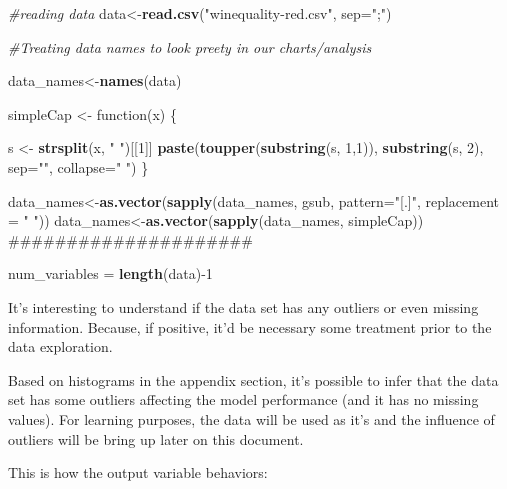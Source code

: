 \documentclass[]{article}
\newenvironment{Shaded}{\begin{snugshade}}{\end{snugshade}}
\newcommand{\KeywordTok}[1]{\textcolor[rgb]{0.13,0.29,0.53}{\textbf{{#1}}}}
\newcommand{\DataTypeTok}[1]{\textcolor[rgb]{0.13,0.29,0.53}{{#1}}}
\newcommand{\DecValTok}[1]{\textcolor[rgb]{0.00,0.00,0.81}{{#1}}}
\newcommand{\StringTok}[1]{\textcolor[rgb]{0.31,0.60,0.02}{{#1}}}
\newcommand{\CommentTok}[1]{\textcolor[rgb]{0.56,0.35,0.01}{\textit{{#1}}}}
\newcommand{\NormalTok}[1]{{#1}}
\begin{document}
\begin{Shaded}
\begin{Highlighting}[]
\CommentTok{#reading data}
\NormalTok{data<-}\KeywordTok{read.csv}\NormalTok{(}\StringTok{"winequality-red.csv"}\NormalTok{, }\DataTypeTok{sep=}\StringTok{";"}\NormalTok{)}


\CommentTok{#Treating data names to look preety in our charts/analysis}

\NormalTok{data_names<-}\KeywordTok{names}\NormalTok{(data)}

\NormalTok{simpleCap <-}\StringTok{ }\NormalTok{function(x) \{}

  \NormalTok{s <-}\StringTok{ }\KeywordTok{strsplit}\NormalTok{(x, }\StringTok{" "}\NormalTok{)[[}\DecValTok{1}\NormalTok{]]}
  \KeywordTok{paste}\NormalTok{(}\KeywordTok{toupper}\NormalTok{(}\KeywordTok{substring}\NormalTok{(s, }\DecValTok{1}\NormalTok{,}\DecValTok{1}\NormalTok{)), }\KeywordTok{substring}\NormalTok{(s, }\DecValTok{2}\NormalTok{),}
        \DataTypeTok{sep=}\StringTok{""}\NormalTok{, }\DataTypeTok{collapse=}\StringTok{" "}\NormalTok{)}
\NormalTok{\}}

\NormalTok{data_names<-}\KeywordTok{as.vector}\NormalTok{(}\KeywordTok{sapply}\NormalTok{(data_names, gsub, }\DataTypeTok{pattern=}\StringTok{"[.]"}\NormalTok{, }\DataTypeTok{replacement =} \StringTok{" "}\NormalTok{))}
\NormalTok{data_names<-}\KeywordTok{as.vector}\NormalTok{(}\KeywordTok{sapply}\NormalTok{(data_names, simpleCap))}
\NormalTok{#####################}

\NormalTok{num_variables =}\StringTok{ }\KeywordTok{length}\NormalTok{(data)-}\DecValTok{1}
\end{Highlighting}
\end{Shaded}

It's interesting to understand if the data set has any outliers or even
missing information. Because, if positive, it'd be necessary some
treatment prior to the data exploration.

Based on histograms in the appendix section, it's possible to infer that
the data set has some outliers affecting the model performance (and it
has no missing values). For learning purposes, the data will be used as
it's and the influence of outliers will be bring up later on this
document.

This is how the output variable behaviors: \newpage

\begin{Shaded}
\end{Shaded}
\end{document}
